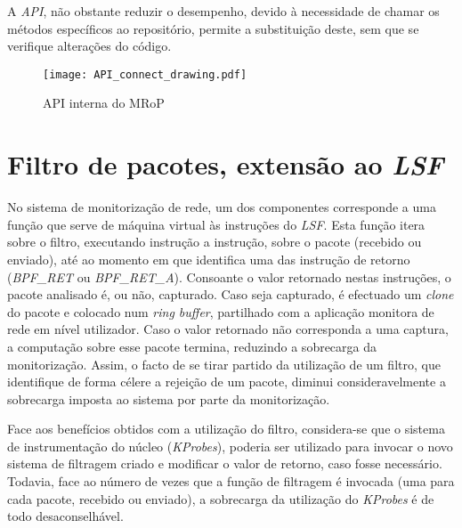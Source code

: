 A \textit{API}, não obstante reduzir o desempenho, devido à necessidade de chamar os métodos específicos ao repositório, permite a substituição deste, sem que se verifique alterações do código.

\begin{figure}[!htbp]
\centering
\texttt{[image: API\_connect\_drawing.pdf]}
\caption{API interna do MRoP}
\label{fig:api_connect}
\end{figure}





\section{Filtro de pacotes, extensão ao \textit{LSF}}

No sistema de monitorização de rede, um dos componentes corresponde a uma função que serve de máquina virtual às instruções do \textit{LSF}.
Esta função itera sobre o filtro, executando instrução a instrução, sobre o pacote (recebido ou enviado), até ao momento em que identifica uma das instrução de retorno (\textit{BPF\_RET} ou \textit{BPF\_RET\_A}).
Consoante o valor retornado nestas instruções, o pacote analisado é, ou não, capturado.
Caso seja capturado, é efectuado um \textit{clone} do pacote e colocado num \textit{ring buffer}, partilhado com a aplicação monitora de rede em nível utilizador.
Caso o valor retornado não corresponda a uma captura, a computação sobre esse pacote termina, reduzindo a sobrecarga da monitorização.
Assim, o facto de se tirar partido da utilização de um filtro, que identifique de forma célere a rejeição de um pacote, diminui consideravelmente a sobrecarga imposta ao sistema por parte da monitorização.

Face aos benefícios obtidos com a utilização do filtro, considera-se que o sistema de instrumentação do núcleo (\textit{KProbes}), poderia ser utilizado para invocar o novo sistema de filtragem criado e modificar o valor de retorno, caso fosse necessário.
Todavia, face ao número de vezes que a função de filtragem é invocada (uma para cada pacote, recebido ou enviado), a sobrecarga da utilização do \textit{KProbes} é de todo desaconselhável.

